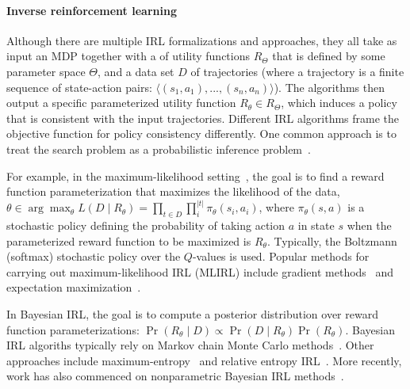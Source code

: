 
\vspace{\up}
\paragraph{Inverse reinforcement learning}

Although there are multiple IRL formalizations and approaches, they
all take as input an MDP together with a  of utility
functions $R_\Theta$ that is defined by some parameter space $\Theta$,
and a data set $D$ of trajectories (where a trajectory is a finite
sequence of state-action pairs: $\langle (s_1, a_1), ..., (s_n, a_n)
\rangle$). The algorithms then output a specific parameterized utility
function $R_\theta \in R_\Theta$, which induces a policy that is
consistent with the input trajectories.
%
Different IRL algorithms frame the objective function for policy
consistency differently. One common approach is to treat the
search problem as a probabilistic inference
problem~\cite{babes11,lopes2009active,ramachandran2007bayesian,ziebart2008maximum}. 

For example, in the maximum-likelihood setting~\cite{babes11}, the
goal is to find a reward function parameterization that maximizes
the likelihood of the data,
%
$\theta \in \arg\max_{\theta} L(D \mid R_{\theta}) = \prod_{t \in D} \prod_i^{|t|} \pi_{\theta}(s_i, a_i)$,
%
where $\pi_{\theta}(s, a)$ is a stochastic policy defining the
probability of taking action $a$ in state $s$ when the parameterized
reward function to be maximized is $R_{\theta}$. Typically, the
Boltzmann (softmax) stochastic policy over the $Q$-values is used.
%
Popular methods for
carrying out maximum-likelihood IRL (MLIRL) include gradient methods~\cite{rumelhart86b}
and expectation maximization~\cite{rabiner89}.

In Bayesian IRL, the goal is to compute a posterior distribution over
reward function parameterizations:
%
$\Pr(R_{\theta} \mid D) \propto \Pr(D \mid R_{\theta}) \Pr(R_\theta)$.
%
Bayesian IRL algoriths typically rely on Markov chain Monte Carlo
methods~\cite{journals/corr/abs-1208-2112,ramachandran2007bayesian}.
%
Other approaches include maximum-entropy~\cite{ziebart2008maximum}
and relative entropy IRL~\cite{BoulariasKP2011}. 
%
More recently, work has also commenced on
nonparametric Bayesian IRL methods~\cite{Choi:2012:NBI:2999134.2999169,Michini2012}.

